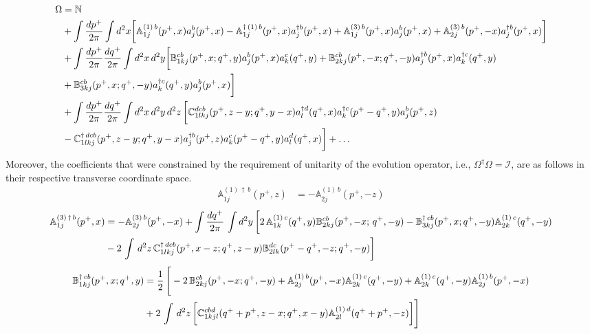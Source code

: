 \documentclass[aps,prd,amsmath,amssymb,nofootinbib]{revtex4-2}
\def\mf#1{\mathbb{#1}}
\numberwithin{equation}{section}
\begin{document}
\begin{align}
    \Omega & = \mf{N} \notag \\ & +
                \int \frac{d p^+}{2\pi} 
             \int d^2 x  
                \bigg[\mf{A}^{(1)\, b}_{1j}(p^{+},x)a^{b}_{j}(p^{+},x) 
                -  \mf{A}^{\dagger\, (1)\, b}_{1j} (p^{+},x) a^{\dagger b}_{j}(p^{+},x)+ \mf{A}^{(3)\, b}_{1j}(p^{+},x)a^{b}_{j}(p^{+},x) 
                +  \mf{A}^{(3)\, b}_{2j} (p^{+},-x) a^{\dagger b}_{j}(p^{+},x)\bigg] \notag \\ & 
               +\int \frac{d p^+}{2\pi} \frac{d q^+}{2\pi} \int d^2x\, d^2y  
               \bigg[\mf{B}^{cb}_{1kj}(p^{+}, x;q^{+}, y) a^{b}_{j}(p^{+},x)a^{c}_{k}(q^{+},y) 
                   + \mf{B}^{cb}_{2kj}(p^{+},-x; q^{+},-y) a^{\dagger b}_{j}(p^{+},x)a^{\dagger c}_{k}(q^{+},y)
            \notag \\ & 
                  + \mf{B}^{cb}_{3kj} (p^{+},x; q^{+}, -y) a^{\dagger c}_{k}(q^{+},y)a^{b}_{j}(p^{+},x)\bigg] \notag \\ & 
               + \int 
               \frac{d p^+}{2\pi} \frac{dq^+}{2\pi} 
               \int d^2x\, d^2y\,  d^2 z\, 
               \bigg[\mf{C}^{ dcb}_{1lkj}(p^{+},z-y; q^{+},y-x) a^{\dagger d}_{l}(q^{+},x)  a^{\dagger c}_{k}(p^{+}-q^{+}, y)  a^{b}_{j}(p^{+},z)
               \notag \\ & 
               -  \mf{C}^{\dagger\, dcb}_{1lkj}(p^{+},z-y; q^{+}, y-x) a^{\dagger b}_{j}(p^{+},z) a^{c}_{k}(p^{+}-q^{+},y) a^{d}_{l}(q^{+},x)\bigg] + \ldots
\end{align}
Moreover, the coefficients that were constrained by the requirement of unitarity of the evolution operator, i.e., $\Omega^{\dagger}\Omega = \mathcal{I}$, are as follows in their respective transverse coordinate space. 
\begin{align}
    \mf{A}^{(1)\, \dagger\,  b}_{1j}(p^{+},z) & =  -\mf{A}^{(1)\, b}_{2j}(p^{+},-z)
\end{align}
\begin{align}
 \mf{A}^{(3)\, \dagger\, b}_{1j}(p^{+},x) & = -\mf{A}^{(3)\, b}_{2j}(p^{+}, -x) +\int \frac{dq^{+}}{2\pi}\, \int d^{2}y\, \bigg[2\, \mf{A}^{(1)\, c}_{1k}(q^{+}, y)\mf{B}^{cb}_{2kj}(p^{+}, -x;\, q^{+},-y)-\mf{B}^{\dagger\, cb}_{3kj}(p^{+}, x; q^{+}, -y)\mf{A}^{(1)\,c}_{2k}(q^{+},-y)\notag \\ & -2\,\int\, d^{2}z\, \mf{C}^{\dagger\, dcb}_{1lkj}(p^{+},x-z; q^{+},z-y)\mf{B}^{dc}_{2lk}(p^{+}-q^{+},-z; q^{+},-y)\bigg]
\end{align}
\begin{align}
    \mf{B}^{\dagger\, cb}_{1kj}(p^{+},x; q^{+},y) & = \frac{1}{2}\, \Bigg[-2\,\mf{B}^{cb}_{2kj}(p^{+},-x; q^{+},-y)+\mf{A}^{(1)\, b}_{2j}(p^{+},-x)\mf{A}^{(1)\, c}_{2k}(q^{+},-y)+ \mf{A}^{(1)\, c}_{2k}(q^{+},-y)\mf{A}^{(1)\, b}_{2j}(p^{+},-x)\notag \\ & +2\,\int\, d^{2}z\, \bigg[\mf{C}^{cbd}_{1kjl}(q^{+}+p^{+},z-x; q^{+},x-y)\mf{A}^{(1)\,d}_{2l}(q^{+}+p^{+},-z)\bigg]\Bigg]
\end{align}
\end{document}
